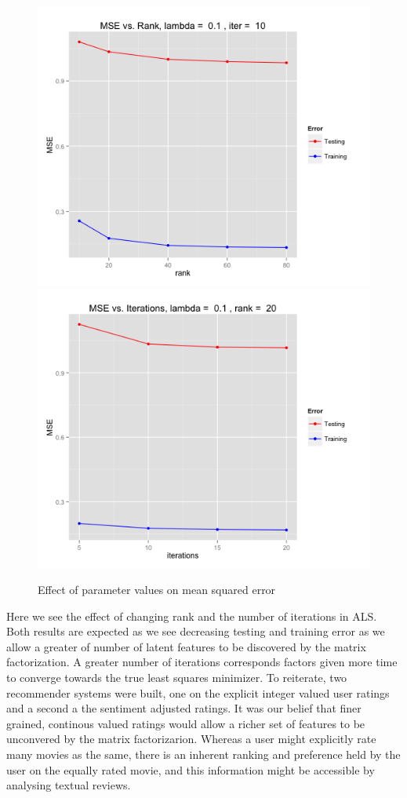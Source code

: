 \documentclass{article} %
\begin{document}
\begin{figure}[H]
  \centering
    \includegraphics[scale=0.4]{effect_rank}
\includegraphics[scale=0.4]{effect_iter}
\caption{Effect of parameter values on mean squared error}
\end{figure}

Here we see the effect of changing rank and the number of iterations in ALS. Both results are expected as we see decreasing testing and training error as we allow a greater of number of latent features to be discovered by the matrix factorization. A greater number of iterations corresponds factors given more time to converge towards the true least squares minimizer. To reiterate, two recommender systems were built, one on the explicit integer valued user ratings and a second a the sentiment adjusted ratings. It was our belief that finer grained, continous valued ratings would allow a richer set of features to be unconvered by the matrix factorizarion. Whereas a user might explicitly rate many movies as the same, there is an inherent ranking and preference held by the user on the equally rated movie, and this information might be accessible by analysing textual reviews. 
\end{document}
